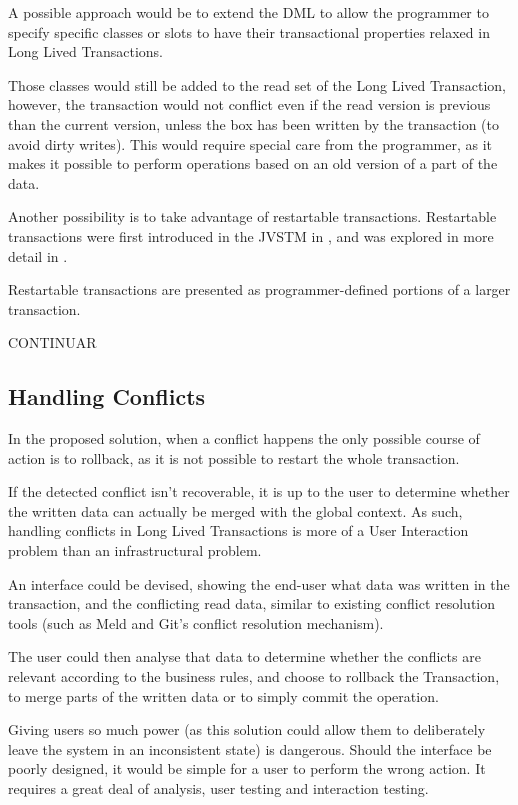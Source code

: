 A possible approach would be to extend the DML to allow the programmer
to specify specific classes or slots to have their transactional
properties relaxed in Long Lived Transactions.

Those classes would still be added to the read set of the Long Lived
Transaction, however, the transaction would not conflict even if the
read version is previous than the current version, unless the box has
been written by the transaction (to avoid dirty writes). This would
require special care from the programmer, as it makes it possible to
perform operations based on an old version of a part of the data.

Another possibility is to take advantage of restartable
transactions. Restartable transactions were first introduced in the
JVSTM in \cite{cachopo2006versioned}, and was explored in more detail
in \cite{BrunoJorgeGasparFranco2013}.

Restartable transactions are presented as programmer-defined portions
of a larger transaction.

CONTINUAR

\subsection{Handling Conflicts}

In the proposed solution, when a conflict happens the only possible
course of action is to rollback, as it is not possible to restart the
whole transaction.

If the detected conflict isn't recoverable, it is up to the user to
determine whether the written data can actually be merged with the
global context. As such, handling conflicts in Long Lived Transactions
is more of a User Interaction problem than an infrastructural problem.

An interface could be devised, showing the end-user what data was
written in the transaction, and the conflicting read data, similar to
existing conflict resolution tools (such as Meld and Git's conflict
resolution mechanism).

The user could then analyse that data to determine whether the
conflicts are relevant according to the business rules, and choose to
rollback the Transaction, to merge parts of the written data or to
simply commit the operation.

Giving users so much power (as this solution could allow them to
deliberately leave the system in an inconsistent state) is
dangerous. Should the interface be poorly designed, it would be simple
for a user to perform the wrong action. It requires a great deal of
analysis, user testing and interaction testing.

